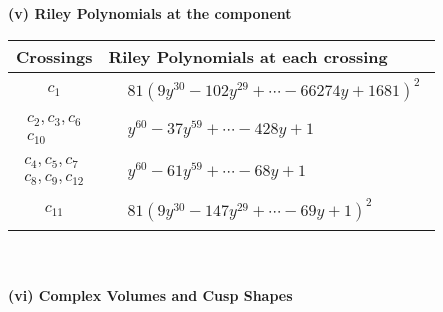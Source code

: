 \documentclass[1p]{elsarticle_modified}
\theoremstyle{definition}
\begin{document}
\newpage\renewcommand{\arraystretch}{1}
\flushleft \textbf{(v) Riley Polynomials at the component}\newline \\
\begin{tabular}{m{50pt}|m{274pt}}
Crossings & \hspace{64pt}Riley Polynomials at each crossing \\
\hline $$\begin{aligned}c_{1}\end{aligned}$$&$\begin{aligned}
&81(9 y^{30}-102 y^{29}+\cdots-66274 y+1681)^{2}
\end{aligned}$\\
\hline $$\begin{aligned}c_{2},c_{3},c_{6}\\c_{10}\end{aligned}$$&$\begin{aligned}
&y^{60}-37 y^{59}+\cdots-428 y+1
\end{aligned}$\\
\hline $$\begin{aligned}c_{4},c_{5},c_{7}\\c_{8},c_{9},c_{12}\end{aligned}$$&$\begin{aligned}
&y^{60}-61 y^{59}+\cdots-68 y+1
\end{aligned}$\\
\hline $$\begin{aligned}c_{11}\end{aligned}$$&$\begin{aligned}
&81(9 y^{30}-147 y^{29}+\cdots-69 y+1)^{2}
\end{aligned}$\\
\hline
\end{tabular}\\~\\
\newpage\flushleft \textbf{(vi) Complex Volumes and Cusp Shapes}
\end{document}
